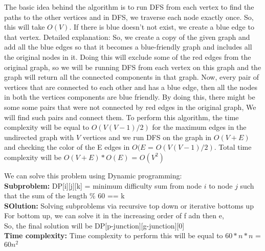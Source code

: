 \documentclass[12pt,twoside]{article}
\begin{document}
\begin{problems}
\newpage
\problem  %
The basic idea behind the algorithm is to run DFS from each vertex to find the paths to the other vertices and in DFS, we traverse each node exactly once. So, this will take $O(V)$. If there is blue doesn't not exist, we create a blue edge to that vertex.
Detailed explanation: So, we create a copy of the given graph and add all the blue edges so that it becomes a blue-friendly graph and includes all the original nodes in it. Doing this will exclude some of the red edges from the original graph, so we will be running DFS from each vertex on this graph and the graph will return all the connected components in that graph. Now, every pair of vertices that are connected to each other and has a blue edge, then all the nodes in both the vertices components are blue friendly. By doing this, there might be some some pairs that were not connected by red edges in the original graph, We will find such pairs and connect them. To perform this algorithm, the time complexity will be equal to $O(V(V-1)/2)$ for the maximum edges in the undirected graph with $V$ vertices and we run DFS on the graph in $O(V+E)$ and checking the color of the E edges in $O(E$ = $O(V(V-1)/2)$. Total time complexity will be $O(V+E) * O(E)$ = $O(V^2)$


\newpage
\problem  %
We can solve this problem using Dynamic programming: \\
\textbf{Subproblem:}
DP[i][j][k] = minimum difficulty sum from node $i$ to node $j$ such that the sum of the length \% 60 == k \\

\textbf{SOlution: }
Solving subproblems via recursive top down or iterative bottoms up\\
For bottom up, we can solve it in the increasing order of f adn then e,\\
So, the final solution will be DP[p-junction][g-junction][0]
\\
\textbf{Time complexity:}
Time complexity to perform this will be equal to $60*n*n$ = $60n^2$ 


\newpage
\problem  %



\newpage
\problem  %


\end{problems}
\end{document}
